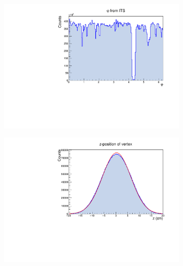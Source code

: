 \documentclass[10pt]{beamer}
\begin{document}
\begin{frame}
\begin{columns}
\begin{column}{0.5\textwidth}
\begin{figure}
\begin{center}
                \end{center}
            \end{figure}
        \end{column}
        \begin{column}{0.5\textwidth}
            \vspace*{-0.43cm}
            \begin{figure}
                \begin{center}
                    \includegraphics[width=0.95\textwidth]{Plots/pass4_TracksIU/phi.pdf}
                \end{center}
            \end{figure}
            \vspace*{-0.6cm}
            \begin{figure}
                \begin{center}
                    \includegraphics[width=0.95\textwidth]{Plots/pass4_TracksIU/Z.pdf}
                \end{center}
            \end{figure}
        \end{column}
    \end{columns}

\end{frame}
\end{document}
